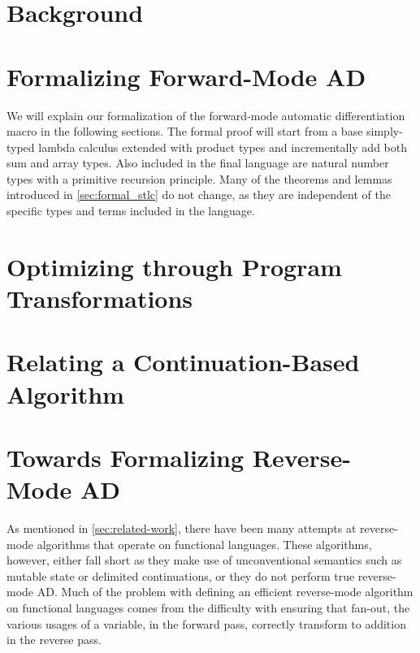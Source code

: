 \documentclass[11pt, final]{article}
\begin{document}

\newpage


\newpage

\setcounter{page}{3}
\tableofcontents
\newpage


\section{Background}\label{sec:bg}





% 

\section{Formalizing Forward-Mode AD}\label{sec:forward}
  We will explain our formalization of the forward-mode automatic differentiation macro in the following sections.
  The formal proof will start from a base simply-typed lambda calculus extended with product types and incrementally add both sum and array types.
  Also included in the final language are natural number types with a primitive recursion principle.
  Many of the theorems and lemmas introduced in \cref{sec:formal_stlc} do not change, as they are independent of the specific types and terms included in the language.
  
  
  
\section{Optimizing through Program Transformations}\label{sec:opt}
  
\section{Relating a Continuation-Based Algorithm}\label{sec:continuation-base}
  
\section{Towards Formalizing Reverse-Mode AD}\label{sec:rev}
  As mentioned in \cref{sec:related-work}, there have been many attempts at reverse-mode algorithms that operate on functional languages.
  These algorithms, however, either fall short as they make use of unconventional semantics such as mutable state or delimited continuations, or they do not perform true reverse-mode AD.
  Much of the problem with defining an efficient reverse-mode algorithm on functional languages comes from the difficulty with ensuring that fan-out, the various usages of a variable, in the forward pass, correctly transform to addition in the reverse pass.
\end{document}
